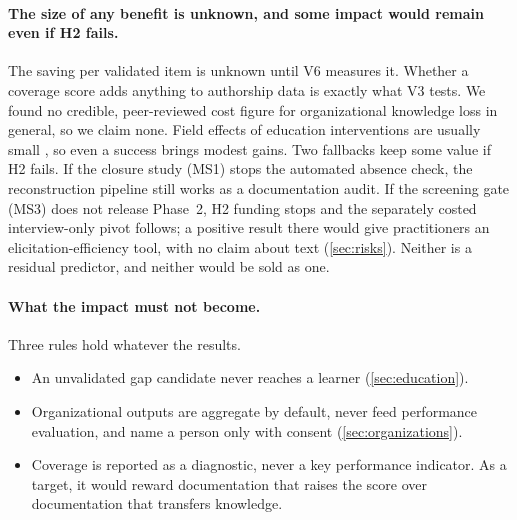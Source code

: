 \paragraph{The size of any benefit is unknown, and some impact would remain even if H2 fails.}
\evint{} The saving per validated item is unknown until V6 measures it. Whether a coverage score
adds anything to authorship data is exactly what V3 tests. We found no credible, peer-reviewed cost
figure for organizational knowledge loss in general, so we claim none. Field effects of education
interventions are usually small \parencite{kraft2020interpreting}, so even a success brings modest
gains. Two fallbacks keep some value if H2 fails. If the closure study (MS1) stops the automated
absence check, the reconstruction pipeline still works as a documentation audit. If the screening
gate (MS3) does not release Phase~2, H2 funding stops and the separately costed interview-only pivot
follows; a positive result there would give practitioners an elicitation-efficiency tool, with no
claim about text (\cref{sec:risks}). Neither is a residual predictor, and neither would be sold as
one.

\paragraph{What the impact must not become.} \evint{} Three rules hold whatever the results.
\begin{itemize}[nosep]
  \item An unvalidated gap candidate never reaches a learner (\cref{sec:education}).
  \item Organizational outputs are aggregate by default, never feed performance evaluation, and name
    a person only with consent (\cref{sec:organizations}).
  \item Coverage is reported as a diagnostic, never a key performance indicator. As a target, it
    would reward documentation that raises the score over documentation that transfers knowledge.
\end{itemize}
